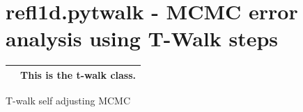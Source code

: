 \documentclass[letterpaper,10pt,english]{sphinxmanual}
\begin{document}

\begin{fulllineitems}
\label{api/profile:refl1d.profile.compute_limited_sigma}
\end{fulllineitems}



\section{refl1d.pytwalk - MCMC error analysis using T-Walk steps}
\label{api/pytwalk::doc}\label{api/pytwalk:refl1d-pytwalk-mcmc-error-analysis-using-t-walk-steps}
\begin{tabulary}{\linewidth}{LL}
\hline

{\hyperref[api/pytwalk:refl1d.pytwalk.pytwalk]{}}
 & 
This is the t-walk class.
\\
\hline
\end{tabulary}

\label{api/pytwalk:module-refl1d.pytwalk}
T-walk self adjusting MCMC
\end{document}
